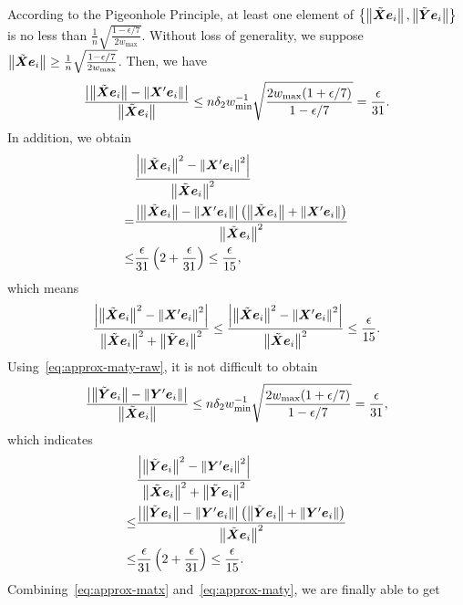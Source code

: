 \documentclass[10pt,twocolumn,twoside]{IEEEtran}
\begin{document}
\begin{IEEEproof}
    According to the Pigeonhole Principle, at least one element of \(\setof{\Abs{\tilde{\matx}\vece_i},\Abs{\tilde{\maty}\vece_i}}\) is no less than \(\frac{1}{n}\sqrt{\frac{1-\epsilon/7}{2w_{\max}}}\).
    Without loss of generality, we suppose \(\Abs{\tilde{\matx}\vece_i}\ge\frac{1}{n}\sqrt{\frac{1-\epsilon/7}{2w_{\max}}}\). Then, we have
    \[\frac{\abs{\Abs{\tilde{\matx}\vece_i}-\Abs{\matx'\vece_i}}}{\Abs{\tilde{\matx}\vece_i}}\le n\delta_2w_{\min}^{-1}\sqrt{\frac{2w_{\max}(1+\epsilon/7)}{1-\epsilon/7}}=\frac{\epsilon}{31}.\]
    In addition, we obtain
    \begin{align*}
            & \frac{\abs{\Abs{\tilde{\matx}\vece_i}^2-\Abs{\matx'\vece_i}^2}}{\Abs{\tilde{\matx}\vece_i}^2}                                                   \\
        =   & \frac{\abs{\Abs{\tilde{\matx}\vece_i}-\Abs{\matx'\vece_i}}\mypar{\Abs{\tilde{\matx}\vece_i}+\Abs{\matx'\vece_i}}}{\Abs{\tilde{\matx}\vece_i}^2} \\
        \le & \frac{\epsilon}{31}\mypar{2+\frac{\epsilon}{31}}\le\frac{\epsilon}{15},
    \end{align*}
    which means
    \begin{equation}\label{eq:approx-matx}
        \frac{\abs{\Abs{\tilde{\matx}\vece_i}^2-\Abs{\matx'\vece_i}^2}}{\Abs{\tilde{\matx}\vece_i}^2+\Abs{\tilde{\maty}\vece_i}^2}\le\frac{\abs{\Abs{\tilde{\matx}\vece_i}^2-\Abs{\matx'\vece_i}^2}}{\Abs{\tilde{\matx}\vece_i}^2}\le\frac{\epsilon}{15}.
    \end{equation}
    Using~\eqref{eq:approx-maty-raw}, it is not difficult to  obtain
    \[\frac{\abs{\Abs{\tilde{\maty}\vece_i}-\Abs{\maty'\vece_i}}}{\Abs{\tilde{\matx}\vece_i}}\le n\delta_2w_{\min}^{-1}\sqrt{\frac{2w_{\max}(1+\epsilon/7)}{1-\epsilon/7}}=\frac{\epsilon}{31},\]
    which indicates
    \begin{equation}\label{eq:approx-maty}
        \begin{split}
            &\frac{\abs{\Abs{\tilde{\maty}\vece_i}^2-\Abs{\maty'\vece_i}^2}}{\Abs{\tilde{\matx}\vece_i}^2+\Abs{\tilde{\maty}\vece_i}^2}\\
            \le&\frac{\abs{\Abs{\tilde{\maty}\vece_i}-\Abs{\maty'\vece_i}}\mypar{\Abs{\tilde{\maty}\vece_i}+\Abs{\maty'\vece_i}}}{\Abs{\tilde{\matx}\vece_i}^2}\\
            \le&\frac{\epsilon}{31}\mypar{2+\frac{\epsilon}{31}}\le\frac{\epsilon}{15}.
        \end{split}
    \end{equation}
    Combining~\eqref{eq:approx-matx} and~\eqref{eq:approx-maty}, we are finally able to get

\end{IEEEproof}
\end{document}
